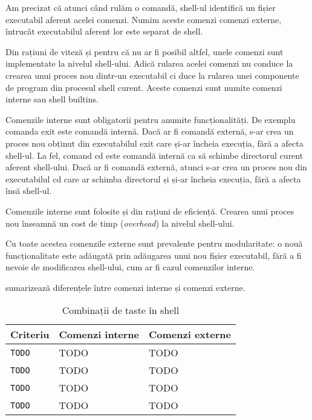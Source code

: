 Am precizat că atunci când rulăm o comandă, shell-ul identifică un fișier
executabil aferent acelei comenzi. Numim aceste comenzi comenzi externe,
întrucât executabilul aferent lor este separat de shell.

Din rațiuni de viteză și pentru că nu ar fi posibil altfel, unele comenzi sunt
implementate la nivelul shell-ului. Adică rularea acelei comenzi nu conduce la
crearea unui proces nou dintr-un executabil ci duce la rularea unei componente
de program din procesul shell curent. Aceste comenzi sunt numite comenzi interne
sau shell builtins.

Comenzile interne sunt obligatorii pentru anumite funcționalități. De exemplu
comanda exit este comandă internă. Dacă ar fi comandă externă, s-ar crea un
proces nou obținut din executabilul exit care și-ar încheia execuția, fără a
afecta shell-ul. La fel, comand cd este comandă internă ca să schimbe directorul
curent aferent shell-ului. Dacă ar fi comandă externă, atunci s-ar crea un
proces nou din executabilul cd care ar schimba directorul și și-ar încheia
execuția, fără a afecta însă shell-ul.

Comenzile interne sunt folosite și din rațiuni de eficiență. Crearea unui proces
nou înseamnă un cost de timp (\textit{overhead}) la nivelul shell-ului.

Cu toate acestea comenzile externe sunt prevalente pentru modularitate: o nouă
funcționalitate este adăugată prin adăugarea unui nou fișier executabil, fără a
fi nevoie de modificarea shell-ului, cum ar fi cazul comenzilor interne.

 sumarizează diferențele între comenzi interne și comenzi
externe.

\begin{table}[!htb]
  \caption{Combinații de taste în shell}
  \begin{center}
    \begin{tabular}{ p{} p{} p{} }
      \toprule
        \textbf{Criteriu} &
        \textbf{Comenzi interne} &
        \textbf{Comenzi externe} \\
      \midrule
        \texttt{TODO} &
        TODO &
        TODO \\

        \texttt{TODO} &
        TODO &
        TODO \\

        \texttt{TODO} &
        TODO &
        TODO \\

        \texttt{TODO} &
        TODO &
        TODO \\
      \bottomrule
    \end{tabular}
    \label{tab:cli:internal-vs-external}
  \end{center}
\end{table}

